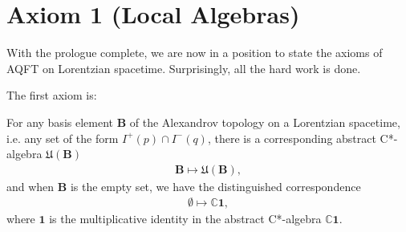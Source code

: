 \section{Axiom 1 (Local Algebras)}\label{sctn:axiom-1-(local-algebras)}
With the prologue complete, we are now in a position to state the axioms of AQFT on Lorentzian spacetime. Surprisingly, all the hard work is done.

The first axiom is:

\begin{axiom}
    For any basis element $\mathbf{B}$ of the Alexandrov topology on a Lorentzian spacetime, i.e. any set of the form $I^+(p) \cap I^-(q)$, there is a corresponding abstract C*-algebra $\mathfrak{U}(\mathbf{B})$
    \begin{align}
        \mathbf{B} \longmapsto \mathfrak{U}(\mathbf{B}),
    \end{align}
    and when $\mathbf{B}$ is the empty set, we have the distinguished correspondence
    \begin{align}
        \emptyset \longmapsto \mathbb{C} \mathbf{1},
    \end{align}
    where $\mathbf{1}$ is the multiplicative identity in the abstract C*-algebra $\mathbb{C} \mathbf{1}$.
\end{axiom}
